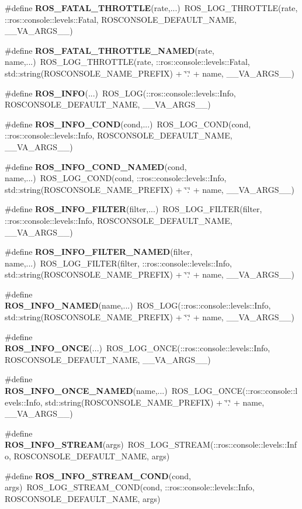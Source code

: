 \begin{DoxyCompactItemize}
\item 
\#define {\bf ROS\_\-FATAL\_\-THROTTLE}(rate,...)~ROS\_\-LOG\_\-THROTTLE(rate, ::ros::console::levels::Fatal, ROSCONSOLE\_\-DEFAULT\_\-NAME, \_\-\_\-VA\_\-ARGS\_\-\_\-)
\item 
\#define {\bf ROS\_\-FATAL\_\-THROTTLE\_\-NAMED}(rate, name,...)~ROS\_\-LOG\_\-THROTTLE(rate, ::ros::console::levels::Fatal, std::string(ROSCONSOLE\_\-NAME\_\-PREFIX) + \char`\"{}.\char`\"{} + name, \_\-\_\-VA\_\-ARGS\_\-\_\-)
\item 
\#define {\bf ROS\_\-INFO}(...)~ROS\_\-LOG(::ros::console::levels::Info, ROSCONSOLE\_\-DEFAULT\_\-NAME, \_\-\_\-VA\_\-ARGS\_\-\_\-)
\item 
\#define {\bf ROS\_\-INFO\_\-COND}(cond,...)~ROS\_\-LOG\_\-COND(cond, ::ros::console::levels::Info, ROSCONSOLE\_\-DEFAULT\_\-NAME, \_\-\_\-VA\_\-ARGS\_\-\_\-)
\item 
\#define {\bf ROS\_\-INFO\_\-COND\_\-NAMED}(cond, name,...)~ROS\_\-LOG\_\-COND(cond, ::ros::console::levels::Info, std::string(ROSCONSOLE\_\-NAME\_\-PREFIX) + \char`\"{}.\char`\"{} + name, \_\-\_\-VA\_\-ARGS\_\-\_\-)
\item 
\#define {\bf ROS\_\-INFO\_\-FILTER}(filter,...)~ROS\_\-LOG\_\-FILTER(filter, ::ros::console::levels::Info, ROSCONSOLE\_\-DEFAULT\_\-NAME, \_\-\_\-VA\_\-ARGS\_\-\_\-)
\item 
\#define {\bf ROS\_\-INFO\_\-FILTER\_\-NAMED}(filter, name,...)~ROS\_\-LOG\_\-FILTER(filter, ::ros::console::levels::Info, std::string(ROSCONSOLE\_\-NAME\_\-PREFIX) + \char`\"{}.\char`\"{} + name, \_\-\_\-VA\_\-ARGS\_\-\_\-)
\item 
\#define {\bf ROS\_\-INFO\_\-NAMED}(name,...)~ROS\_\-LOG(::ros::console::levels::Info, std::string(ROSCONSOLE\_\-NAME\_\-PREFIX) + \char`\"{}.\char`\"{} + name, \_\-\_\-VA\_\-ARGS\_\-\_\-)
\item 
\#define {\bf ROS\_\-INFO\_\-ONCE}(...)~ROS\_\-LOG\_\-ONCE(::ros::console::levels::Info, ROSCONSOLE\_\-DEFAULT\_\-NAME, \_\-\_\-VA\_\-ARGS\_\-\_\-)
\item 
\#define {\bf ROS\_\-INFO\_\-ONCE\_\-NAMED}(name,...)~ROS\_\-LOG\_\-ONCE(::ros::console::levels::Info, std::string(ROSCONSOLE\_\-NAME\_\-PREFIX) + \char`\"{}.\char`\"{} + name, \_\-\_\-VA\_\-ARGS\_\-\_\-)
\item 
\#define {\bf ROS\_\-INFO\_\-STREAM}(args)~ROS\_\-LOG\_\-STREAM(::ros::console::levels::Info, ROSCONSOLE\_\-DEFAULT\_\-NAME, args)
\item 
\#define {\bf ROS\_\-INFO\_\-STREAM\_\-COND}(cond, args)~ROS\_\-LOG\_\-STREAM\_\-COND(cond, ::ros::console::levels::Info, ROSCONSOLE\_\-DEFAULT\_\-NAME, args)

\end{DoxyCompactItemize}
